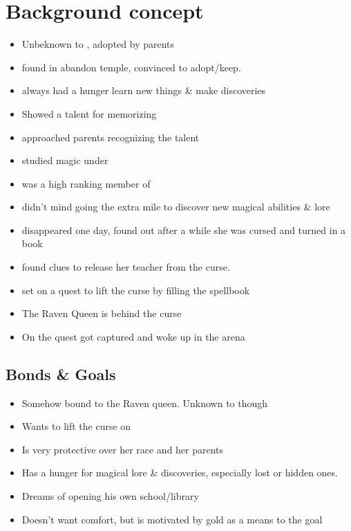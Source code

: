     \section{Background concept}
    \begin{itemize}
        \item Unbeknown to \Name{}, adopted by parents
        \item \Mom{} found \Name{} in abandon temple, convinced \Dad{} to adopt/keep.
        \item \Name{} always had a hunger learn new things \& make discoveries
        \item \Name{} Showed a talent for memorizing
        \item \MasterFullName{} approached parents recognizing the talent
        \item \Name{} studied magic under \Master{}
        \item \Master{} was a high ranking member of \CloisterIntro{}
        \item \Name{} didn't mind going the extra mile to discover new magical abilities \& lore
        \item \Master disappeared one day, \Name{} found out after a while she was cursed and turned in a book
        \item \Name{} found clues to release her teacher from the curse.
        \item \Name{} set on a quest to lift the curse by filling the spellbook
        \item The Raven Queen is behind the curse
        \item On the quest \Name{} got captured and woke up in the arena
      \end{itemize}
      

    \subsection{Bonds \& Goals}
    \begin{itemize}
        \item Somehow bound to the Raven queen. Unknown to \Name{} though
        \item Wants to lift the curse on \MasterFullName{}
        \item Is very protective over her race and her parents
        \item Has a hunger for magical lore \& discoveries, especially lost or hidden ones.
        \item Dreams of opening his own school/library
        \item Doesn't want comfort, but is motivated by gold as a means to the goal
    \end{itemize}

